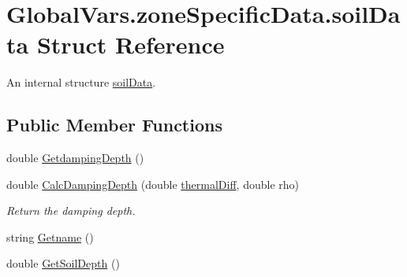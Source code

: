\hypertarget{struct_global_vars_1_1zone_specific_data_1_1soil_data}{}\section{Global\+Vars.\+zone\+Specific\+Data.\+soil\+Data Struct Reference}
\label{struct_global_vars_1_1zone_specific_data_1_1soil_data}


An internal structure \mbox{\hyperlink{struct_global_vars_1_1zone_specific_data_1_1soil_data}{soil\+Data}}.  


\subsection*{Public Member Functions}
\begin{DoxyCompactItemize}
\item 
double \mbox{\hyperlink{struct_global_vars_1_1zone_specific_data_1_1soil_data_a3c6e5c9493ccc4e2097cf1c44fdf42b1}{Getdamping\+Depth}} ()
\item 
double \mbox{\hyperlink{struct_global_vars_1_1zone_specific_data_1_1soil_data_ac1e39d153db5d24b006172b9a44ee05a}{Calc\+Damping\+Depth}} (double \mbox{\hyperlink{struct_global_vars_1_1zone_specific_data_1_1soil_data_a0488e637c08e5ff87bc85a1cd4bfac9c}{thermal\+Diff}}, double rho)
\begin{DoxyCompactList}\small\item\em Return the damping depth. \end{DoxyCompactList}\item 
string \mbox{\hyperlink{struct_global_vars_1_1zone_specific_data_1_1soil_data_a510ebb36fe6c8151c41361fb5b285d1e}{Getname}} ()
\item 
double \mbox{\hyperlink{struct_global_vars_1_1zone_specific_data_1_1soil_data_a5f038b5960f38630b8edf6075f97154e}{Get\+Soil\+Depth}} ()
\end{DoxyCompactItemize}
